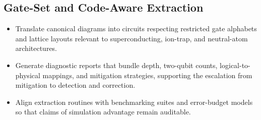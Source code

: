 \subsection{Gate-Set and Code-Aware Extraction}
\begin{itemize}
  \item Translate canonical diagrams into circuits respecting restricted gate alphabets and lattice layouts relevant to superconducting, ion-trap, and neutral-atom architectures.
  \item Generate diagnostic reports that bundle depth, two-qubit counts, logical-to-physical mappings, and mitigation strategies, supporting the escalation from mitigation to detection and correction.
  \item Align extraction routines with benchmarking suites and error-budget models so that claims of simulation advantage remain auditable.
\end{itemize}

